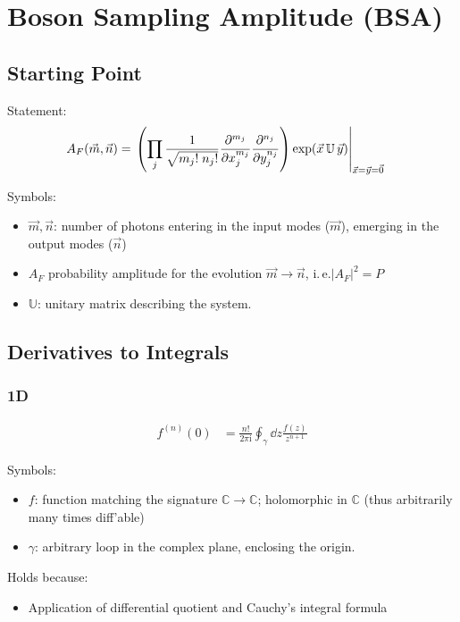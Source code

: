 \documentclass[
	english,
	a4paper,
	fontsize=10pt,
	parskip=half,
	titlepage=true,
	DIV=12,
	final
]{scrreprt}
\title{\myTitle}
\author{\myName}
\date{\today}
\newcommand*{\ie}{i.\,e.\xspace}
\newcommand*{\thus}{\ensuremath{\rightarrow}\xspace}
\newcommand*{\iunit}{\ensuremath{\mathrm{i}}}
\newcommand*{\setComplex}  {\ensuremath{\mathbb{C}}}
\begin{document}
\tableofcontents
\newpage

\chapter{Boson Sampling Amplitude (BSA)}
\section{Starting Point}
Statement:
\begin{align}
	A_F(\vec{m}, \vec{n})
&=
	\eval{\qty(
			\prod_{j}
			\frac
				{1}
				{\sqrt{m_j! \; n_j!}}
			\pdv[m_j]{x_j}
			\pdv[n_j]{y_j}
		) \exp(\vec{x} \, \mathbb{U} \, \vec{y})
	}_{\vec{x} = \vec{y} = \vec{0}}
\label{eqn:BSA_raw}
\end{align}

Symbols:
\begin{itemize}
\item $\vec{m}, \vec{n}$: number of photons entering in the input modes ($\vec{m}$), emerging in the
	output modes ($\vec{n}$)
\item $A_F$ probability amplitude for the evolution $\vec{m} \thus \vec{n}$, \ie $|A_F|^{2} = P$
\item $\mathbb{U}$: unitary matrix describing the system.
\end{itemize}


\section{Derivatives to Integrals}
\subsection{1D} 
\label{sec:DevToInt_1D}
\begin{align}
	f^{(n)}(0)
&=
	\frac{n!}{2\pi \iunit}
	\oint_\gamma \dd{z}
		\frac
			{f(z)}
			{z^{n+1}}
\end{align}

Symbols:
\begin{itemize}
\item $f$: function matching the signature $\setComplex \thus \setComplex$; holomorphic in \setComplex
	(thus arbitrarily many times diff'able)
\item $\gamma$: arbitrary loop in the complex plane, enclosing the origin.
\end{itemize}

Holds because:
\begin{itemize}
\item Application of differential quotient and Cauchy's integral formula
\end{itemize}
\end{document}
